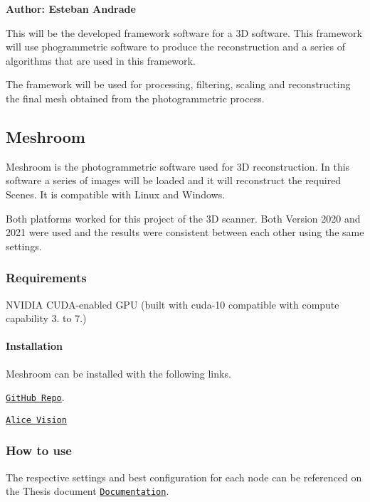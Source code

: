 {\bfseries Author\+: Esteban Andrade}

This will be the developed framework software for a 3D software. This framework will use phogrammetric software to produce the reconstruction and a series of algorithms that are used in this framework.

The framework will be used for processing, filtering, scaling and reconstructing the final mesh obtained from the photogrammetric process.

\subsection*{Meshroom}

Meshroom is the photogrammetric software used for 3D reconstruction. In this software a series of images will be loaded and it will reconstruct the required Scenes. It is compatible with Linux and Windows.

Both platforms worked for this project of the 3D scanner. Both Version 2020 and 2021 were used and the results were consistent between each other using the same settings.

\subsubsection*{Requirements}

N\+V\+I\+D\+IA C\+U\+D\+A-\/enabled G\+PU (built with cuda-\/10 compatible with compute capability 3. to 7.)

\paragraph*{Installation}

Meshroom can be installed with the following links.


\begin{DoxyItemize}
\item \href{https://github.com/alicevision/meshroom}{\tt Git\+Hub Repo}.
\item \href{https://alicevision.org/#meshroom}{\tt Alice Vision}
\end{DoxyItemize}

\subsubsection*{How to use}

The respective settings and best configuration for each node can be referenced on the Thesis document \href{https://github.com/esteban-andrade/3D-Reconstructrion-Scanner/blob/main/A21%20-%2004017%20Final%20Report%20Esteban%20Andrade%20Zambrano.pdf}{\tt Documentation}.

